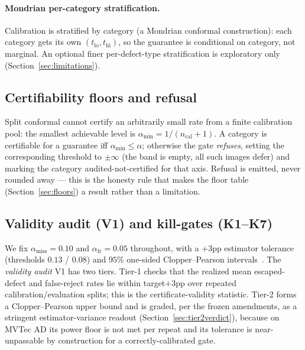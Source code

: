 \documentclass[preprint,11pt]{elsarticle}
\begin{document}
\paragraph{Mondrian per-category stratification.} Calibration is stratified by category (a Mondrian
conformal construction): each category gets its own $(t_{\text{lo}}, t_{\text{hi}})$, so the
guarantee is conditional on category, not marginal. An optional finer per-defect-type
stratification is exploratory only (Section~\ref{sec:limitations}).

\subsection{Certifiability floors and refusal}
\label{sec:floor}

Split conformal cannot certify an arbitrarily small rate from a finite calibration pool: the
smallest achievable level is $\alpha_{\min} = 1/(n_{\text{cal}}+1)$. A category is certifiable for a
guarantee iff $\alpha_{\min} \le \alpha$; otherwise the gate \emph{refuses}, setting the
corresponding threshold to $\pm\infty$ (the band is empty, all such images defer) and marking the
category audited-not-certified for that axis. Refusal is emitted, never rounded away
--- this is the honesty rule that makes the floor table (Section~\ref{sec:floors}) a result rather
than a limitation.

\subsection{Validity audit (V1) and kill-gates (K1--K7)}
\label{sec:v1}

We fix $\alpha_{\text{miss}}=0.10$ and $\alpha_{\text{fr}}=0.05$ throughout, with a $+3$pp
estimator tolerance (thresholds $0.13$ / $0.08$) and $95\%$ one-sided Clopper--Pearson
intervals~\citep{clopper1934use}.
The \emph{validity audit} V1 has two tiers. Tier-1 checks that the realized mean escaped-defect and
false-reject rates lie within target$+3$pp over repeated calibration/evaluation splits; this is the
certificate-validity statistic. Tier-2 forms a Clopper--Pearson upper bound and is graded, per the
frozen amendments, as a stringent estimator-variance readout (Section~\ref{sec:tier2verdict}),
because on MVTec AD its power floor is not met per repeat and its tolerance is near-unpassable by
construction for a correctly-calibrated gate.
\end{document}
